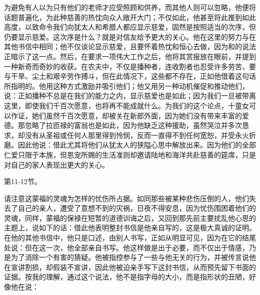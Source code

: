 为避免有人以为只有他们的老师才应受照顾和供养，而其他人则可以忽略，他便将话题普遍化，为此种慈善的热忱向众人敞开大门；不仅如此，他甚至将此推到如此高度，以致命令我们向犹太人和希腊人都应显示慈爱，固然是按照适当的次序，但仍要显示慈爱。这次序是什么？就是对信友给予更大的关心。他在这里的努力与在其他书信中相同；他不仅谈论显示慈爱，且要怀着热忱和恒心去做，因为和的说法正暗示了这一点。然后，在要求一项伟大工作之后，他将其赏报放在眼前，并提到一种新奇而奇妙的收获。在农夫中，不仅是播种者，连收割者也忍受许多劳苦，要与干旱、尘土和艰辛劳作搏斗，但在此情况下，这些都不存在，正如他借着这句话所指明的。他用这种方式激励并吸引他们；他又用另一种动机催促和推动他们，说：正如播种不总是在我们的能力之内，显示慈爱也是如此；因为我们一旦被带离这里，即使我们千百次愿意，也将再不能成就什么。为我们的这个论点，十童女可以作证，她们虽然千百次愿意，却被关在新郎外面，因为她们没有带来丰富的爱德。那忽略了拉匝禄的富翁也是如此，因为他缺乏这种援助，虽然哭泣并多次恳求，却没有从圣祖或任何人那里得到怜悯，反而一直得不到任何宽恕，并受永火折磨。因此他说：借此尤其将他们从犹太人的狭隘心思中解放出来。因为他们的全部仁爱只限于本族，但恩宠所赐的生活准则却邀请陆地和海洋共赴慈善的筵席，只是对自己的家人表现出更大的关心。\par

第11-12节。\par

请注意这蒙福的灵魂为怎样的忧伤所占据。如同那些被某种悲伤压倒的人，他们失去了自己的亲人，遭受了意想不到的灾祸，日夜不得安息，因为忧伤围困着他们的灵魂，同样，蒙福的保禄在短暂的道德训诲之后，又回到那先前主要扰乱他心思的主题上，说如下的话：借此他表明整封书信是他亲自写的，这是极大真诚的证明。在他的其他书信中，他只是口述，由别人书写，正如从明显可见，因为在它的结尾处说：但在这一次，他全部亲自书写。他这样做是出于必要，而不仅出于情感，乃是为了消除一个有害的猜疑。他被指控参与了一些与他无关的行为，并被传言说他在宣讲割损，却假装不宣讲，因此他被迫亲手写下这封书信，从而预先留下书面的证据。按我的理解，通过这个说法，他不是指字母的大小，而是指形状的丑陋，好像他在说：\par

